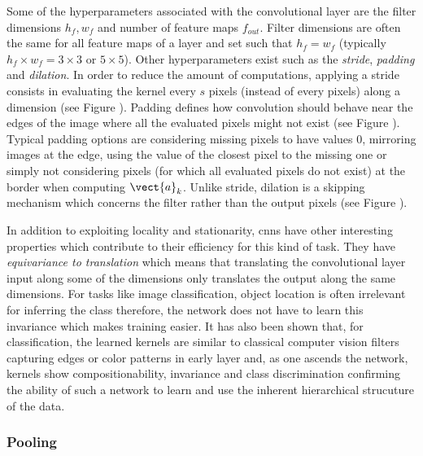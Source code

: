 Some of the hyperparameters associated with the convolutional layer are the filter dimensions $h_f, w_f$ and number of feature maps $f_{out}$. Filter dimensions are often the same for all feature maps of a layer and set such that $h_f = w_f$ (typically $h_f \times w_f = 3 \times 3$ or $5 \times 5$). Other hyperparameters exist such as the \textit{stride}, \textit{padding} and \textit{dilation}. In order to reduce the amount of computations, applying a stride consists in evaluating the kernel every $s$ pixels (instead of every pixels) along a dimension (see Figure ). Padding defines how convolution should behave near the edges of the image where all the evaluated pixels might not exist (see Figure ). Typical padding options are considering missing pixels to have values 0, mirroring images at the edge, using the value of the closest pixel to the missing one or simply not considering pixels (\ie for which all evaluated pixels do not exist) at the border when computing $\vect{a}_k$. Unlike stride, dilation is a skipping mechanism which concerns the filter rather than the output pixels (see Figure ). 

In addition to exploiting locality and stationarity, \acrshort{cnn}s have other interesting properties which contribute to their efficiency for this kind of task. They have \textit{equivariance to translation} which means that translating the convolutional layer input along some of the dimensions only translates the output along the same dimensions. For tasks like image classification, object location is often irrelevant for inferring the class therefore, the network does not have to learn this invariance which makes training easier. It has also been shown that, for classification, the learned kernels are similar to classical computer vision filters capturing edges or color patterns in early layer and, as one ascends the network, kernels show compositionability, invariance and class discrimination \parencite{zeiler2014visualizing} confirming the ability of such a network to learn and use the inherent hierarchical strucuture of the data.




\subsubsection{Pooling}
\label{sssec:backml:pooling}    


